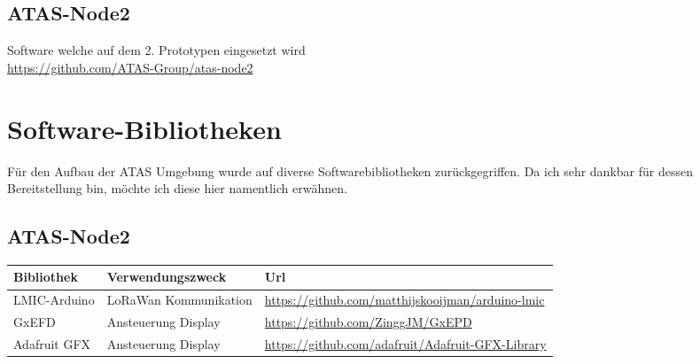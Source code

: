 \documentclass[11pt,english,german]{report}
\theoremstyle{definition}
\begin{document}
\subsection{ATAS-Node2}
Software welche auf dem 2. Prototypen eingesetzt wird\\
\url{https://github.com/ATAS-Group/atas-node2}

\newpage


\newpage
\section{Software-Bibliotheken}
Für den Aufbau der ATAS Umgebung wurde auf diverse Softwarebibliotheken zurückgegriffen. Da ich sehr dankbar für dessen Bereitstellung bin, möchte ich diese hier namentlich erwähnen.

\subsection{ATAS-Node2}
\begin{tabularx}{\linewidth}{llX}
	\textbf{Bibliothek} & \textbf{Verwendungszweck} & \textbf{Url} \\ \hline
	LMIC-Arduino & LoRaWan Kommunikation & \url{https://github.com/matthijskooijman/arduino-lmic}\\ \hline
	GxEFD & Ansteuerung Display & \url{https://github.com/ZinggJM/GxEPD}\\ \hline
	Adafruit GFX & Ansteuerung Display & \url{https://github.com/adafruit/Adafruit-GFX-Library}\\ \hline
\end{tabularx}

\listoffigures
\end{document}
